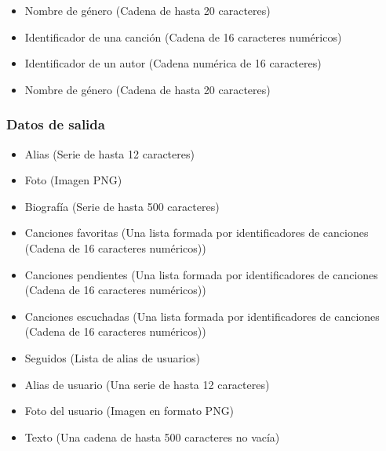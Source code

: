 \begin{itemize}
  \item Nombre de género (Cadena de hasta 20 caracteres)
\end{itemize}

\begin{itemize}
  \item Identificador de una canción (Cadena de 16 caracteres numéricos)
  \item Identificador de un autor (Cadena numérica de 16 caracteres)
  \item Nombre de género (Cadena de hasta 20 caracteres)
\end{itemize}
\subsubsection{Datos de salida}
\setcounter{RD}{1}



\begin{itemize}
\item Alias (Serie de hasta 12 caracteres)
\item Foto (Imagen PNG)
\item Biografía (Serie de hasta 500 caracteres)
\item Canciones favoritas (Una lista formada por identificadores de canciones (Cadena de 16 caracteres numéricos))
\item Canciones pendientes (Una lista formada por identificadores de canciones (Cadena de 16 caracteres numéricos))
\item Canciones escuchadas (Una lista formada por identificadores de canciones (Cadena de 16 caracteres numéricos))
\item Seguidos (Lista de alias de usuarios)
\end{itemize}


\begin{itemize}
\item Alias de usuario (Una serie de hasta 12 caracteres)
\item Foto del usuario (Imagen en formato PNG)
\item Texto (Una cadena de hasta 500 caracteres no vacía)
\end{itemize}

